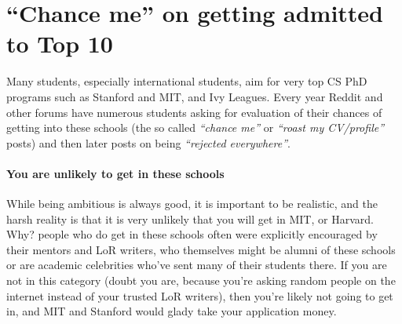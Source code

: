\documentclass[oneside,11pt,dvipsnames]{book}
\begin{document}


\section{``Chance me'' on getting admitted to Top 10}\label{sec:chance-me}

Many students, especially international students, aim for very top CS PhD programs such as Stanford and MIT, and Ivy Leagues. Every year Reddit and other forums have numerous students asking for evaluation of their chances of getting into these schools (the so called \emph{``chance me''} or \emph{``roast my CV/profile''} posts) and then later posts on being \emph{``rejected everywhere''}.

\paragraph{You are unlikely to get in these schools}  While being ambitious is always good, it is important to be realistic, and the harsh reality is that it is very unlikely that you will get in MIT, or Harvard. Why? people who do get in these schools often were explicitly encouraged by their mentors and LoR writers, who themselves might be alumni of these schools or are academic celebrities who've sent many of their students there. If you are not in this category (doubt you are, because you're asking random people on the internet instead of your trusted LoR writers), then you're likely not going to get in, and MIT and Stanford would glady take your application money.
\end{document}
